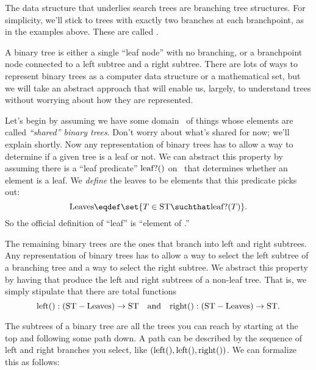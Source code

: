 The data structure that underlies search trees are branching tree
structures.  For simplicity, we'll stick to trees with exactly two
branches at each branchpoint, as in the examples above.  These are
called .

A binary tree is either a single ``leaf node'' with no branching, or a
branchpoint node connected to a left subtree and a right subtree.
There are lots of ways to represent binary trees as a computer data
structure or a mathematical set, but we will take an abstract approach
that will enable us, largely, to understand trees without worrying
about how they are represented.

Let's begin by assuming we have some domain \sharetree\ of things
whose elements are called \emph{``shared'' binary trees}.  Don't worry
about what's shared for now; we'll explain shortly.  Now any
representation of binary trees has to allow a way to determine if a
given tree is a leaf or not.  We can abstract this property by
assuming there is a ``leaf predicate'' $\text{leaf?}()$ on \sharetree\ that
determines whether an element is a leaf.  We \emph{define} the leaves
to be elements that this predicate picks out:
\[
\leafset \eqdef \set{T \in \sharetree \suchthat \leafp{T}}.
\]
So the official definition of ``leaf'' is ``element of \leafset.''

The remaining binary trees are the ones that branch into left and
right subtrees.  Any representation of binary trees has to allow a way
to select the left subtree of a branching tree and a way to select the
right subtree.  We abstract this property by having  that produce the left and right subtrees of a non-leaf
tree.  That is, we simply stipulate that there are total functions
\[
\text{left}(): (\text{ST} - \text{Leaves}) \to \text{ST}\quad \text{and} \quad
\text{right}(): (\text{ST} - \text{Leaves}) \to \text{ST}.
\]

The subtrees of a binary tree are all the trees you can reach by
starting at the top and following some path down.  A path can be
described by the sequence of left and right branches you select, like
$(\text{left}(),\text{left}(),\text{right}())$.  We can formalize this as
follows:

